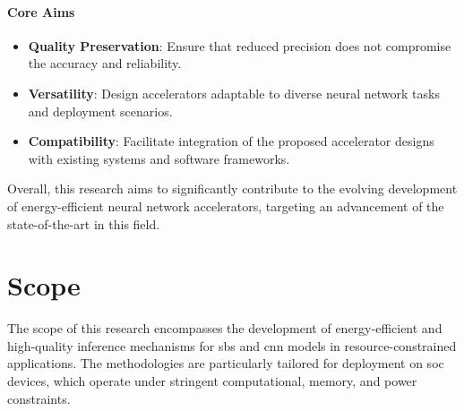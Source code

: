 \paragraph{Core Aims}
\begin{itemize}
	\item \textbf{Quality Preservation}: Ensure that reduced precision does not compromise the accuracy and reliability.
	\item \textbf{Versatility}: Design accelerators adaptable to diverse neural network tasks and deployment scenarios.
	\item \textbf{Compatibility}: Facilitate integration of the proposed accelerator designs with existing systems and software frameworks.
\end{itemize}

Overall, this research aims to significantly contribute to the evolving development of energy-efficient neural network accelerators, targeting an advancement of the state-of-the-art in this field.

\section{Scope}\label{chap1.scope}

The scope of this research encompasses the development of energy-efficient and high-quality inference mechanisms for \gls{sbs} and \gls{cnn} models in resource-constrained applications. The methodologies are particularly tailored for deployment on \gls{soc} devices, which operate under stringent computational, memory, and power constraints.

